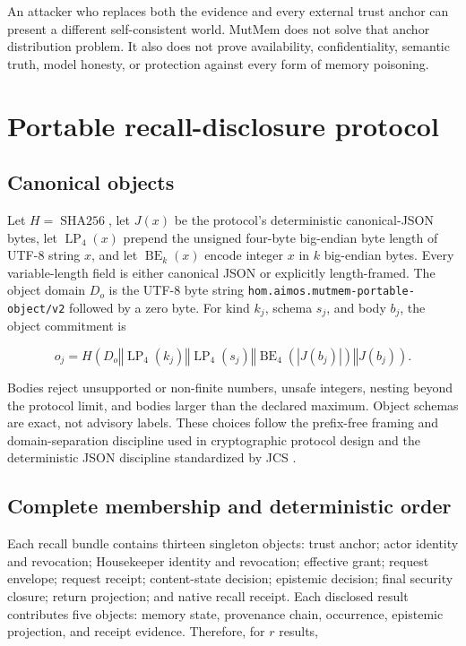 \documentclass[10pt]{article}
\newcommand{\concat}{\mathbin\Vert}
\newcommand{\SHA}{\operatorname{SHA256}}
\begin{document}
An attacker who replaces both the evidence and every external trust anchor can
present a different self-consistent world. MutMem does not solve that anchor
distribution problem. It also does not prove availability, confidentiality,
semantic truth, model honesty, or protection against every form of memory
poisoning.

\section{Portable recall-disclosure protocol}

\subsection{Canonical objects}

Let $H=\SHA$, let $J(x)$ be the protocol's deterministic canonical-JSON bytes,
let $\operatorname{LP}_4(x)$ prepend the unsigned four-byte big-endian byte
length of UTF-8 string $x$, and let $\operatorname{BE}_k(x)$ encode integer $x$
in $k$ big-endian bytes. Every variable-length field is either canonical JSON or
explicitly length-framed. The object domain $D_o$ is the UTF-8 byte string
\texttt{hom.aimos.mutmem-portable-object/v2} followed by a zero byte. For kind
$k_j$, schema $s_j$, and body $b_j$, the object commitment is

\begin{equation}
o_j = H\!\left(
D_o \concat \operatorname{LP}_4(k_j)
\concat \operatorname{LP}_4(s_j)
\concat \operatorname{BE}_4(|J(b_j)|)
\concat J(b_j)
\right).
\label{eq:object}
\end{equation}

Bodies reject unsupported or non-finite numbers, unsafe integers, nesting beyond
the protocol limit, and bodies larger than the declared maximum. Object schemas
are exact, not advisory labels. These choices follow the prefix-free framing and
domain-separation discipline used in cryptographic protocol design
\cite{bonehshoup} and the deterministic JSON discipline standardized by JCS
\cite{rfc8785}.

\subsection{Complete membership and deterministic order}

Each recall bundle contains thirteen singleton objects: trust anchor; actor
identity and revocation; Housekeeper identity and revocation; effective grant;
request envelope; request receipt; content-state decision; epistemic decision;
final security closure; return projection; and native recall receipt. Each
disclosed result contributes five objects: memory state, provenance chain,
occurrence, epistemic projection, and receipt evidence. Therefore, for $r$
results,
\end{document}
